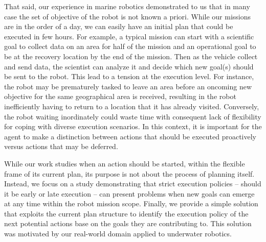 That said, our experience in marine robotics demonstrated to us that
in many case the set of objective of the robot is not known a
priori. While our missions are in the order of a day, we can easily
have an initial plan that could be executed in few hours. For example,
a typical mission can start with a scientific goal to collect data on
an area for half of the mission and an operational goal to be at the
recovery location by the end of the mission. Then as the vehicle
collect and send data, the scientist can analyze it and decide which
new goal(s) should be sent to the robot. This lead to a tension at the
execution level.  For instance, the robot may be prematurely tasked to
leave an area before an oncoming new objective for the same
geographical area is received, resulting in the robot inefficiently
having to return to a location that it has already
visited. Conversely, the robot waiting inordinately could waste time
with consequent lack of flexibility for coping with diverse execution
scenarios. In this context, it is important for the agent to make a
distinction between actions that should be executed proactively versus
actions that may be deferred.


While our work studies when an action should be started, within the
flexible frame of its current plan, its purpose is not about the
process of planning itself. Instead, we focus on a study demonstrating
that strict execution policies -- should it be early or late execution
-- can present problems when new goals can emerge at any time within
the robot mission scope. Finally, we provide a simple solution that
exploits the current plan structure to identify the execution policy
of the next potential actions base on the goals they are contributing
to. This solution was motivated by our real-world domain applied to
underwater robotics.




